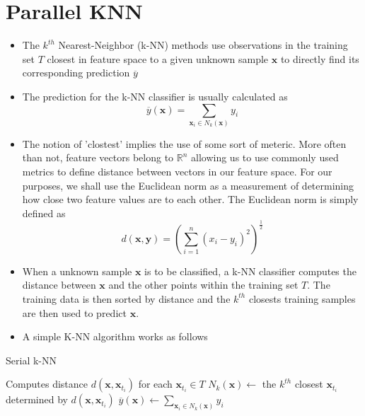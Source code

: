 \section{Parallel KNN}

\begin{itemize}
    \item The $k^{th}$ Nearest-Neighbor (k-NN) methods use observations in the training set $T$ closest in feature space to a given unknown sample $\bm{x}$ to directly find its corresponding prediction $\overline{y}$
    \item The prediction for the k-NN classifier is usually calculated as 
    \[
        \overline{y} \left( \bm{x} \right) = \sum_{\bm{x}_{i} \in N_{k} (\bm{x})} y_{i}
    \]
    \item The notion of 'clostest' implies the use of some sort of meteric. More often than not, feature vectors belong to $\mathbb{R}^{n}$ allowing us to use commonly used metrics to define distance between vectors in our feature space. For our purposes, we shall use the Euclidean norm as a measurement of determining how close two feature values are to each other. The Euclidean norm is simply defined as
    \[
        d \left( \bm{x}, \bm{y} \right) = \left( \sum_{i=1}^{n} \left( x_{i} - y_{i} \right)^{2} \right)^{\frac{1}{2}}
    \]
    \item When a unknown sample $\bm{x}$ is to be classified, a k-NN classifier computes the distance between $\bm{x}$ and the other points within the training set $T$. The training data is then sorted by distance and the $k^{th}$ closests training samples are then used to predict $\bm{x}$.
    \item A simple K-NN algorithm works as follows
\end{itemize}
\begin{algorithm}[ht!!!]
\caption{Serial k-NN}
\label{alg:serial-k-NN}
\footnotesize
\SetAlgoLined
    
    \BlankLine
    Computes distance $d \left( \bm{x}, \bm{x}_{t_i} \right)$ for each $\bm{x}_{t_i} \in T$\;
    $N_{k} (\bm{x}) \gets$ the $k^{th}$ closest $\bm{x}_{t_i}$ determined by $d \left( \bm{x}, \bm{x}_{t_i} \right)$\;
    $\overline{y} \left( \bm{x} \right) \gets \sum_{\bm{x}_{i} \in N_{k} (\bm{x})} y_{i}$\;
    \BlankLine
\end{algorithm}
